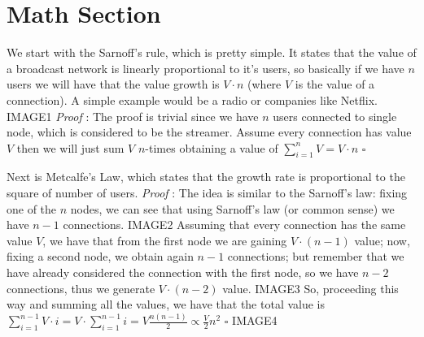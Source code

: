 \documentclass[12pt, a4page]{article}
\begin{document}
\part*{Math Section}
We start with the Sarnoff's rule, which is pretty simple.
It states that the value of a broadcast network is linearly proportional to it's users, so basically if we have $n$ users we will have that the value growth is $V \cdot n$ (where $V$ is the value of a connection).
A simple example would be a radio or companies like Netflix.
\newline IMAGE1 \newline
\textit{Proof} : The proof is trivial since we have $n$ users connected to single node, which is considered to be the streamer.
Assume every connection has value $V$ then we will just sum $V$ $n$-times obtaining a value of $\sum_{i=1}^{n} V = V \cdot n$ \hfill $\square$
\newline
\newline

Next is Metcalfe's Law, which states that the growth rate is proportional to the square of number of users.\newline
\textit{Proof} : The idea is similar to the Sarnoff's law: fixing one of the $n$ nodes, we can see that using Sarnoff's law (or common sense) we have $n-1$ connections.
IMAGE2 \newline
Assuming that every connection has the same value $V$, we have that from the first node we are gaining $V \cdot (n - 1)$ value; now, fixing a second node, we obtain again $n-1$ connections; but remember that we have already considered the connection with the first node, so we have $n-2$ connections, thus we generate $V \cdot (n - 2)$ value. \newline
IMAGE3 \newline
So, proceeding this way and summing all the values, we have that the total value is $\sum_{i=1}^{n-1} V \cdot i = V \cdot \sum_{i=1}^{n-1} i = V \frac{n(n-1)}{2} \propto \frac{V}{2} n^2$  \hfill $\square$
\newline IMAGE4 \newline
\end{document}
